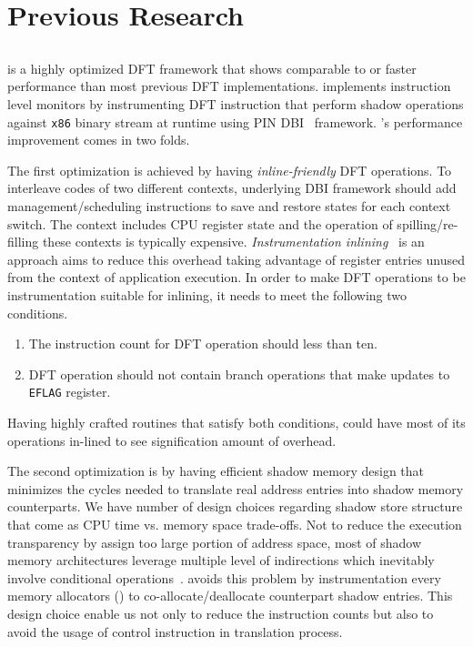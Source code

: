 \section{Previous Research}
\label{sec:previous}
\subsection{\libdft}

\libdft is a highly optimized DFT framework that shows comparable to or faster
performance than most previous DFT implementations. \libdft implements
instruction level monitors by instrumenting DFT instruction that perform shadow
operations against {\tt x86} binary stream at runtime using PIN
DBI~\cite{pin:pldi2005} framework.
%
\libdft's performance improvement comes in two folds. 

The first optimization is achieved by having {\it inline-friendly} DFT
operations. To interleave codes of two different contexts, underlying DBI
framework should add management/scheduling instructions to save and restore
states for each context switch. The context includes CPU register state  and
the operation of spilling/re-filling these contexts is typically expensive.
{\it Instrumentation inlining}~\cite{inlining:wbia2006} is an approach aims to
reduce this overhead taking advantage of register entries unused from the
context of application execution. In order to make DFT operations to be
instrumentation suitable for inlining, it needs to meet the following two
conditions.
%
\begin{enumerate} \item The instruction count for DFT operation should less
than ten.  \item DFT operation should not contain branch operations that make
updates to {\tt EFLAG} register.  \end{enumerate} 
%
Having highly crafted routines that satisfy both conditions, \libdft could have
most of its operations in-lined to see signification amount of overhead.

The second optimization is by having efficient shadow memory design that
minimizes the cycles needed to translate real address entries into shadow
memory counterparts. We have number of design choices regarding shadow store
structure that come as CPU time vs. memory space trade-offs. Not to reduce the
execution transparency by assign too large portion of address space, most of
shadow memory architectures leverage multiple level of indirections which
inevitably involve conditional operations~\cite{}. \libdft avoids this problem
by instrumentation every memory allocators ()
to co-allocate/deallocate counterpart shadow entries. This design choice enable
us not only to reduce the instruction counts but also to avoid the usage of
control instruction in translation process.

